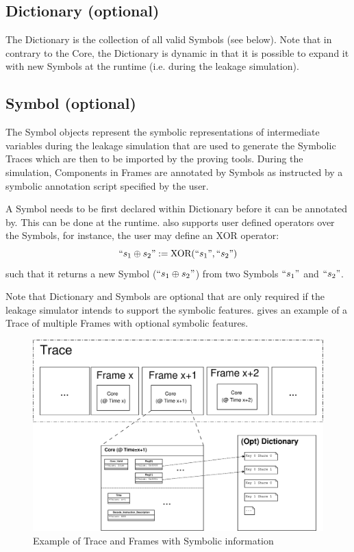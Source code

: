 \documentclass[]{report}
\begin{document}
\subsection{Dictionary (optional)}
The Dictionary is the collection of all valid Symbols (see below). Note that in contrary to the Core, the Dictionary is dynamic in that it is possible to expand it with new Symbols at the runtime (i.e. during the leakage simulation).

\subsection{Symbol (optional)}
The Symbol objects represent the symbolic representations of intermediate variables during the leakage simulation that are used to generate the Symbolic Traces which are then to be imported by the proving tools. During the simulation, Components in Frames are annotated by Symbols as instructed by a symbolic annotation script specified by the user. 

A Symbol needs to be first declared within Dictionary before it can be annotated by. This can be done at the runtime. \smurf also supports user defined operators over the Symbols, for instance, the user may define an XOR operator:
\[
	\text{``} s_1 \oplus s_2 \text{''} := \text{XOR}(\text{``} s_1 \text{''}, \text{``} s_2 \text{''})
\]
such that it returns a new Symbol ($\text{``} s_1 \oplus s_2 \text{''}$) from two Symbols $\text{``} s_1 \text{''}$ and $\text{``} s_2 \text{''}$.

Note that Dictionary and Symbols are optional that are only required if the leakage simulator intends to support the symbolic features.  gives an example of a Trace of multiple Frames with optional symbolic features.

\begin{figure}
	\centering
	\includegraphics[width=0.9\linewidth]{Figures/Trace.eps}
	\caption{Example of Trace and Frames with Symbolic information\label{fig:TraceAndFrames}}
\end{figure}
\end{document}
